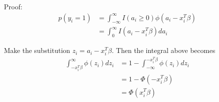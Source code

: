 \documentclass{amsart}
\begin{document}
Proof:
\begin{align*}
p(y_i = 1) &= \int_{-\infty}^{\infty} I(a_i \geq 0) \phi(a_i - x_i^T \beta) \\
&= \int_{0}^{\infty} I(a_i - x_i^T \beta) d a_i
\end{align*}

Make the substitution $z_i = a_i - x_i^T \beta$. Then the integral above becomes
\begin{align*}
\int_{-x_i^T \beta}^{\infty} \phi(z_i) d z_i
&= 1 - \int_{-\infty}^{-x_i^T \beta} \phi(z_i) d z_i \\
&= 1 - \Phi(-x_i^T \beta) \\
&= \Phi(x_i^T \beta)
\end{align*}
\end{document}
